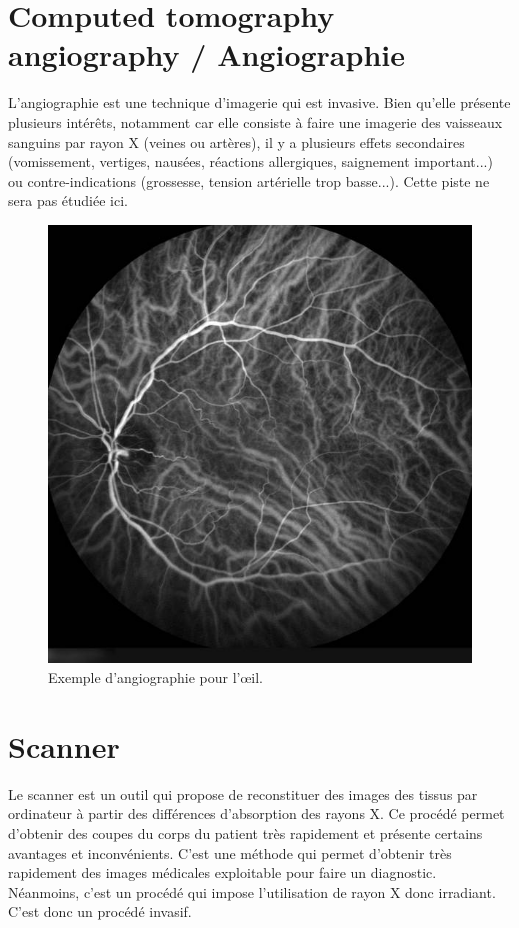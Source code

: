 \section{Computed tomography angiography / Angiographie}

L'angiographie est une technique d'imagerie qui est invasive. Bien qu'elle présente plusieurs intérêts, notamment car elle consiste à faire une imagerie des vaisseaux sanguins par rayon X (veines ou artères), il y a plusieurs effets secondaires (vomissement, vertiges, nausées, réactions allergiques, saignement important...) ou contre-indications (grossesse, tension artérielle trop basse...). Cette piste ne sera pas étudiée ici.

\begin{figure}[H]
\centering
    \includegraphics[scale=0.4,angle=0]{Images/m_1407858437.jpg}
    \caption{Exemple d'angiographie pour l'œil.}
    \label{fig:m_1407858437}
\end{figure}

\section{Scanner}

Le scanner est un outil qui propose de reconstituer des images des tissus par ordinateur à partir des différences d'absorption des rayons X. Ce procédé permet d'obtenir des coupes du corps du patient très rapidement et présente certains avantages et inconvénients. C'est une méthode qui permet d'obtenir très rapidement des images médicales exploitable pour faire un diagnostic. Néanmoins, c'est un procédé qui impose l'utilisation de rayon X donc irradiant. C'est donc un procédé invasif.


